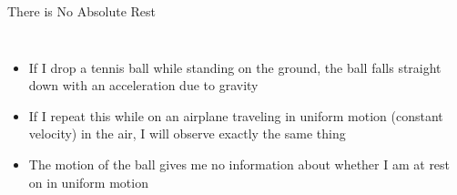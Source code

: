 \documentclass[12pt,compress,aspectratio=169]{beamer}
\begin{document}
\begin{frame}{There is No Absolute Rest}
  \begin{center}
  \end{center}
  \begin{columns}
    
    \vspace{-.3in}
    \begin{itemize}
    \item If I drop a tennis ball while standing on the ground, the ball falls
      straight down with an acceleration due to gravity
    \item If I repeat this while on an airplane traveling in uniform motion
      (constant velocity) in the air, I will observe exactly the same thing
    \item The motion of the ball gives me no information about whether I am
      at rest on in uniform motion
    \end{itemize}
  \end{columns}
\end{frame}




\end{document}
